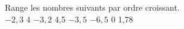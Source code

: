 %
%
	Range les nombres suivants par ordre croissant. \\
	\(-2,3\) \hfill 4 \hfill \(-3,2\) \hfill 4,5 \hfill \(-3,5\) \hfill \(-6,5\) \hfill 0 \hfill 1,78
